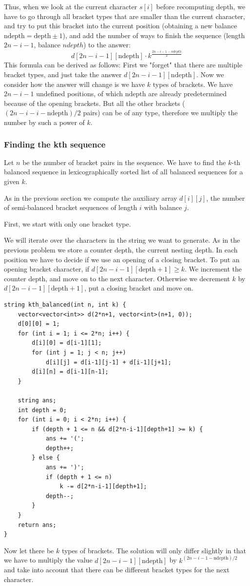 \documentclass[8pt, a4paper, oneside, twocolumn]{extarticle}
\begin{document}
Thus, when we look at the current character $s[i]$ before recomputing $\text{depth}$, we have to go through all bracket types that are smaller than the current character, and try to put this bracket into the current position (obtaining a new balance $\text{ndepth} = \text{depth} \pm 1$), and add the number of ways to finish the sequence (length $2n-i-1$, balance $ndepth$) to the answer: $$d[2n - i - 1][\text{ndepth}] \cdot k^{\frac{2n - i - 1 - ndepth}{2}}$$ This formula can be derived as follows: First we "forget" that there are multiple bracket types, and just take the answer $d[2n - i - 1][\text{ndepth}]$. Now we consider how the answer will change is we have $k$ types of brackets. We have $2n - i - 1$ undefined positions, of which $\text{ndepth}$ are already predetermined because of the opening brackets. But all the other brackets ($(2n - i - i - \text{ndepth})/2$ pairs) can be of any type, therefore we multiply the number by such a power of $k$.
\subsubsection{Finding the kth sequence}
Let $n$ be the number of bracket pairs in the sequence. We have to find the $k$-th balanced sequence in lexicographically sorted list of all balanced sequences for a given $k$.

As in the previous section we compute the auxiliary array $d[i][j]$, the number of semi-balanced bracket sequences of length $i$ with balance $j$.

First, we start with only one bracket type.

We will iterate over the characters in the string we want to generate. As in the previous problem we store a counter $\text{depth}$, the current nesting depth. In each position we have to decide if we use an opening of a closing bracket. To put an opening bracket character, if $d[2n - i - 1][\text{depth}+1] \ge k$. We increment the counter $\text{depth}$, and move on to the next character. Otherwise we decrement $k$ by $d[2n - i - 1][\text{depth}+1]$, put a closing bracket and move on.
\begin{verbatim}
string kth_balanced(int n, int k) {
    vector<vector<int>> d(2*n+1, vector<int>(n+1, 0));
    d[0][0] = 1;
    for (int i = 1; i <= 2*n; i++) {
        d[i][0] = d[i-1][1];
        for (int j = 1; j < n; j++)
            d[i][j] = d[i-1][j-1] + d[i-1][j+1];
        d[i][n] = d[i-1][n-1];
    }

    string ans;
    int depth = 0;
    for (int i = 0; i < 2*n; i++) {
        if (depth + 1 <= n && d[2*n-i-1][depth+1] >= k) {
            ans += '(';
            depth++;
        } else {
            ans += ')';
            if (depth + 1 <= n)
                k -= d[2*n-i-1][depth+1];
            depth--;
        }
    }
    return ans;
}
\end{verbatim}
Now let there be $k$ types of brackets. The solution will only differ slightly in that we have to multiply the value $d[2n-i-1][\text{ndepth}]$ by $k^{(2n-i-1-\text{ndepth})/2}$ and take into account that there can be different bracket types for the next character.
\end{document}
